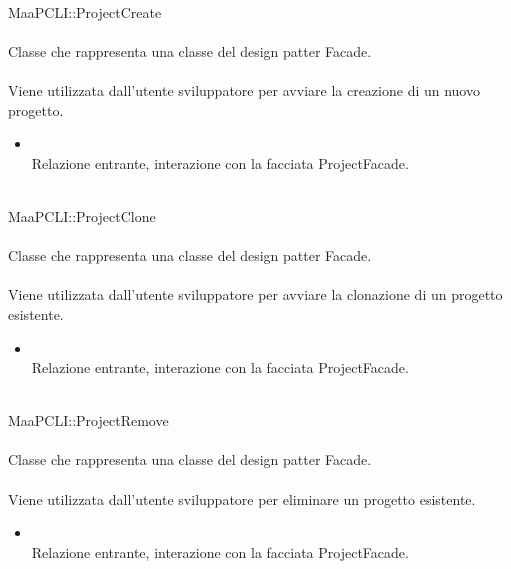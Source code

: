 	\\
	MaaPCLI::ProjectCreate\\
	\\
	Classe che rappresenta una classe del design patter Facade.\\
	\\
	Viene utilizzata dall'utente sviluppatore per avviare la creazione di un nuovo progetto.\\
	\begin{itemize}
	\item{}\\
	Relazione entrante, interazione con la facciata ProjectFacade.
	\end{itemize}
	
	\\
	MaaPCLI::ProjectClone\\
	\\
	Classe che rappresenta una classe del design patter Facade.\\
	\\
	Viene utilizzata dall'utente sviluppatore per avviare la clonazione di un progetto esistente.\\
	\begin{itemize}
	\item{}\\
	Relazione entrante, interazione con la facciata ProjectFacade.
	\end{itemize}
	
	\\
	MaaPCLI::ProjectRemove\\
	\\
	Classe che rappresenta una classe del design patter Facade.\\
	\\
	Viene utilizzata dall'utente sviluppatore per eliminare un progetto esistente.\\
	\begin{itemize}
	\item{}\\
	Relazione entrante, interazione con la facciata ProjectFacade.
	\end{itemize}

